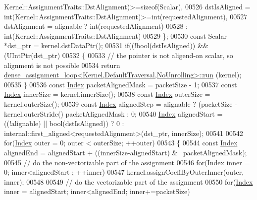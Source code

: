 \begin{DoxyCode}
      Kernel::AssignmentTraits::DstAlignment)>=\textcolor{keyword}{sizeof}(Scalar),
00526       dstIsAligned = \textcolor{keywordtype}{int}(Kernel::AssignmentTraits::DstAlignment)>=int(requestedAlignment),
00527       dstAlignment = alignable ? int(requestedAlignment)
00528                                : int(Kernel::AssignmentTraits::DstAlignment)
00529     \};
00530     \textcolor{keyword}{const} Scalar *dst\_ptr = kernel.dstDataPtr();
00531     \textcolor{keywordflow}{if}((!\textcolor{keywordtype}{bool}(dstIsAligned)) && (UIntPtr(dst\_ptr) %
00532     \{
00533       \textcolor{comment}{// the pointer is not aligend-on scalar, so alignment is not possible}
00534       \textcolor{keywordflow}{return} \hyperlink{struct_eigen_1_1internal_1_1dense__assignment__loop}{dense\_assignment\_loop<Kernel,DefaultTraversal,NoUnrolling>::run}
      (kernel);
00535     \}
00536     \textcolor{keyword}{const} \hyperlink{namespace_eigen_a62e77e0933482dafde8fe197d9a2cfde}{Index} packetAlignedMask = packetSize - 1;
00537     \textcolor{keyword}{const} \hyperlink{namespace_eigen_a62e77e0933482dafde8fe197d9a2cfde}{Index} innerSize = kernel.innerSize();
00538     \textcolor{keyword}{const} \hyperlink{namespace_eigen_a62e77e0933482dafde8fe197d9a2cfde}{Index} outerSize = kernel.outerSize();
00539     \textcolor{keyword}{const} \hyperlink{namespace_eigen_a62e77e0933482dafde8fe197d9a2cfde}{Index} alignedStep = alignable ? (packetSize - kernel.outerStride() %
      packetAlignedMask : 0;
00540     \hyperlink{namespace_eigen_a62e77e0933482dafde8fe197d9a2cfde}{Index} alignedStart = ((!alignable) || \textcolor{keywordtype}{bool}(dstIsAligned)) ? 0 : 
      internal::first\_aligned<requestedAlignment>(dst\_ptr, innerSize);
00541 
00542     \textcolor{keywordflow}{for}(\hyperlink{namespace_eigen_a62e77e0933482dafde8fe197d9a2cfde}{Index} outer = 0; outer < outerSize; ++outer)
00543     \{
00544       \textcolor{keyword}{const} \hyperlink{namespace_eigen_a62e77e0933482dafde8fe197d9a2cfde}{Index} alignedEnd = alignedStart + ((innerSize-alignedStart) & ~packetAlignedMask);
00545       \textcolor{comment}{// do the non-vectorizable part of the assignment}
00546       \textcolor{keywordflow}{for}(\hyperlink{namespace_eigen_a62e77e0933482dafde8fe197d9a2cfde}{Index} inner = 0; inner<alignedStart ; ++inner)
00547         kernel.assignCoeffByOuterInner(outer, inner);
00548 
00549       \textcolor{comment}{// do the vectorizable part of the assignment}
00550       \textcolor{keywordflow}{for}(\hyperlink{namespace_eigen_a62e77e0933482dafde8fe197d9a2cfde}{Index} inner = alignedStart; inner<alignedEnd; inner+=packetSize)

\end{DoxyCode}
